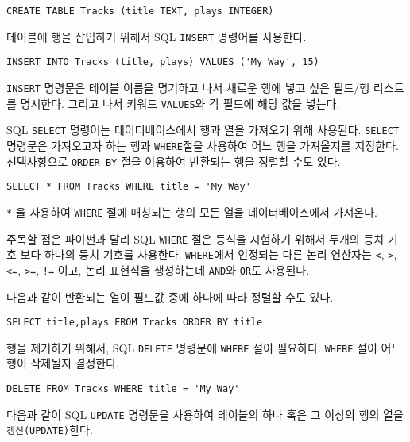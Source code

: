 \beforeverb
\begin{verbatim}
CREATE TABLE Tracks (title TEXT, plays INTEGER)
\end{verbatim}
\afterverb
%

테이블에 행을 삽입하기 위해서 SQL {\tt INSERT} 명령어를 사용한다.

\beforeverb
\begin{verbatim}
INSERT INTO Tracks (title, plays) VALUES ('My Way', 15)
\end{verbatim}
\afterverb
%

{\tt INSERT} 명령문은 테이블 이름을 명기하고 나서 새로운 행에 넣고 싶은 필드/행 리스트를 명시한다.
그리고 나서 키워드 {\tt VALUES}와 각 필드에 해당 값을 넣는다.

SQL {\tt SELECT} 명령어는 데이터베이스에서 행과 열을 가져오기 위해 사용된다.
{\tt SELECT} 명령문은 가져오고자 하는 행과 {\tt WHERE}절을 사용하여 어느 행을 가져올지를 지정한다.
선택사항으로 {\tt ORDER BY} 절을 이용하여 반환되는 행을 정렬할 수도 있다.

\beforeverb
\begin{verbatim}
SELECT * FROM Tracks WHERE title = 'My Way'
\end{verbatim}
\afterverb
%

\verb"*" 을 사용하여 {\tt WHERE} 절에 매칭되는 행의 모든 열을 데이터베이스에서 가져온다.

주목할 점은 파이썬과 달리 SQL {\tt WHERE} 절은 등식을 시험하기 위해서 두개의 등치 기호 보다 하나의 등치 기호를 사용한다.
{\tt WHERE}에서 인정되는 다른 논리 연산자는 
\verb"<",
\verb">",
\verb"<=",
\verb">=",
\verb"!=" 이고, 논리 표현식을 생성하는데 {\tt AND}와 {\tt OR}도 사용된다.

다음과 같이 반환되는 열이 필드값 중에 하나에 따라 정렬할 수도 있다.

\beforeverb
\begin{verbatim}
SELECT title,plays FROM Tracks ORDER BY title
\end{verbatim}
\afterverb
%

행을 제거하기 위해서, SQL {\tt DELETE} 명령문에 {\tt WHERE} 절이 필요하다.
{\tt WHERE} 절이 어느 행이 삭제될지 결정한다.

\beforeverb
\begin{verbatim}
DELETE FROM Tracks WHERE title = 'My Way'
\end{verbatim}
\afterverb
%

다음과 같이 SQL {\tt UPDATE} 명령문을 사용하여 테이블의 하나 혹은 그 이상의 행의 열을 {\tt 갱신(UPDATE)}한다.

